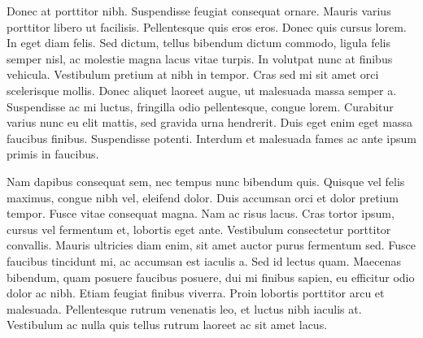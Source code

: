 \documentclass{jamk-report}
\begin{document}
Donec at porttitor nibh. Suspendisse feugiat consequat ornare.
Mauris varius porttitor libero ut facilisis. Pellentesque quis
eros eros. Donec quis cursus lorem. In eget diam felis. Sed
dictum, tellus bibendum dictum commodo, ligula felis semper nisl,
ac molestie magna lacus vitae turpis. In volutpat nunc at finibus
vehicula. Vestibulum pretium at nibh in tempor. Cras sed mi sit
amet orci scelerisque mollis. Donec aliquet laoreet augue, ut
malesuada massa semper a. Suspendisse ac mi luctus, fringilla odio
pellentesque, congue lorem. Curabitur varius nunc eu elit mattis,
sed gravida urna hendrerit. Duis eget enim eget massa faucibus
finibus. Suspendisse potenti. Interdum et malesuada fames ac ante
ipsum primis in faucibus.

Nam dapibus consequat sem, nec tempus nunc bibendum quis. Quisque
vel felis maximus, congue nibh vel, eleifend dolor. Duis accumsan
orci et dolor pretium tempor. Fusce vitae consequat magna. Nam ac
risus lacus. Cras tortor ipsum, cursus vel fermentum et, lobortis
eget ante. Vestibulum consectetur porttitor convallis. Mauris
ultricies diam enim, sit amet auctor purus fermentum sed. Fusce
faucibus tincidunt mi, ac accumsan est iaculis a. Sed id lectus
quam. Maecenas bibendum, quam posuere faucibus posuere, dui mi
finibus sapien, eu efficitur odio dolor ac nibh. Etiam feugiat
finibus viverra. Proin lobortis porttitor arcu et malesuada.
Pellentesque rutrum venenatis leo, et luctus nibh iaculis at.
Vestibulum ac nulla quis tellus rutrum laoreet ac sit amet lacus.
\end{document}
